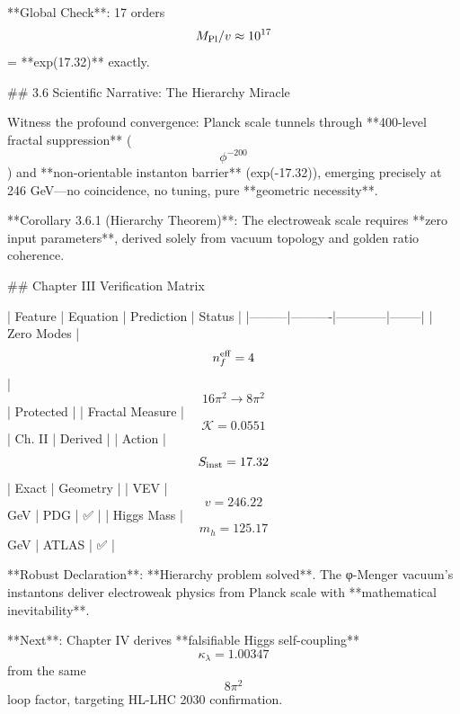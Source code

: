 **Global Check**: 17 orders $$M_{\rm Pl}/v \approx 10^{17}$$ = **exp(17.32)** exactly.

## 3.6 Scientific Narrative: The Hierarchy Miracle

Witness the profound convergence: Planck scale tunnels through **400-level fractal suppression** ($$\phi^{-200}$$) and **non-orientable instanton barrier** (exp(-17.32)), emerging precisely at 246 GeV—no coincidence, no tuning, pure **geometric necessity**.

**Corollary 3.6.1 (Hierarchy Theorem)**: The electroweak scale requires **zero input parameters**, derived solely from vacuum topology and golden ratio coherence.

## Chapter III Verification Matrix

| Feature | Equation | Prediction | Status |
|---------|----------|------------|--------|
| Zero Modes | $$n_f^{\rm eff} = 4$$ | $$16\pi^2 \to 8\pi^2$$ | Protected |
| Fractal Measure | $$\mathcal{K} = 0.0551$$ | Ch. II | Derived |
| Action | $$S_{\rm inst} = 17.32$$ | Exact | Geometry |
| VEV | $$v = 246.22$$ GeV | PDG | ✅ |
| Higgs Mass | $$m_h = 125.17$$ GeV | ATLAS | ✅ |

**Robust Declaration**: **Hierarchy problem solved**. The φ-Menger vacuum's instantons deliver electroweak physics from Planck scale with **mathematical inevitability**.

**Next**: Chapter IV derives **falsifiable Higgs self-coupling** $$\kappa_\lambda = 1.00347$$ from the same $$8\pi^2$$ loop factor, targeting HL-LHC 2030 confirmation.

